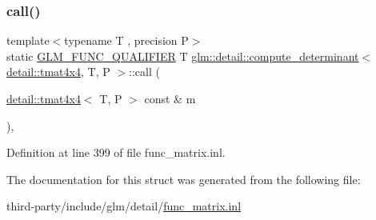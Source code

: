 \subsubsection{\texorpdfstring{call()}{call()}}
{\footnotesize\ttfamily template$<$typename T , precision P$>$ \\
static \hyperlink{setup_8hpp_a33fdea6f91c5f834105f7415e2a64407}{G\+L\+M\+\_\+\+F\+U\+N\+C\+\_\+\+Q\+U\+A\+L\+I\+F\+I\+ER} T \hyperlink{structglm_1_1detail_1_1compute__determinant}{glm\+::detail\+::compute\+\_\+determinant}$<$ \hyperlink{structglm_1_1detail_1_1tmat4x4}{detail\+::tmat4x4}, T, P $>$\+::call (\begin{DoxyParamCaption}\item[{\hyperlink{structglm_1_1detail_1_1tmat4x4}{detail\+::tmat4x4}$<$ T, P $>$ const \&}]{m }\end{DoxyParamCaption})\hspace{0.3cm}{\ttfamily [inline]}, {\ttfamily [static]}}



Definition at line 399 of file func\+\_\+matrix.\+inl.



The documentation for this struct was generated from the following file\+:\begin{DoxyCompactItemize}
\item 
third-\/party/include/glm/detail/\hyperlink{func__matrix_8inl}{func\+\_\+matrix.\+inl}\end{DoxyCompactItemize}
